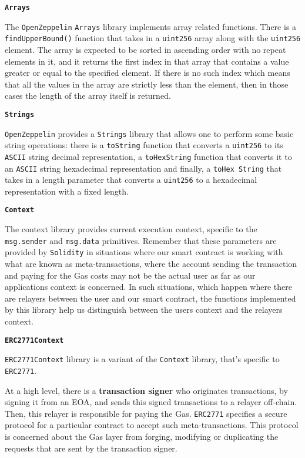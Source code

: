 \textbf{\texttt{Arrays}}

The \texttt{OpenZeppelin} \texttt{Arrays} library implements array
related functions. There is a \texttt{findUpperBound()} function that
takes in a \texttt{uint256} array along with the \texttt{uint256}
element. The array is expected to be sorted in ascending order with no
repeat elements in it, and it returns the first index in that array that
contains a value greater or equal to the specified element. If there is
no such index which means that all the values in the array are strictly
less than the element, then in those cases the length of the array
itself is returned.

\textbf{\texttt{Strings}}

\texttt{OpenZeppelin} provides a \texttt{Strings} library that allows
one to perform some basic string operations: there is a
\texttt{toString} function that converts a \texttt{uint256} to its
\texttt{ASCII} string decimal representation, a \texttt{toHexString}
function that converts it to an \texttt{ASCII} string hexadecimal
representation and finally, a \texttt{toHex\ String} that takes in a
length parameter that converts a \texttt{uint256} to a hexadecimal
representation with a fixed length.

\textbf{\texttt{Context}}

The context library provides current execution context, specific to the
\texttt{msg.sender} and \texttt{msg.data} primitives. Remember that
these parameters are provided by \texttt{Solidity} in situations where
our smart contract is working with what are known as meta-transactions,
where the account sending the transaction and paying for the Gas costs
may not be the actual user as far as our applications context is
concerned. In such situations, which happen where there are relayers
between the user and our smart contract, the functions implemented by
this library help us distinguish between the users context and the
relayers context.

\textbf{\texttt{ERC2771Context}}

\texttt{ERC2771Context} library is a variant of the \texttt{Context}
library, that's specific to \texttt{ERC2771}.

At a high level, there is a \textbf{transaction signer} who originates
transactions, by signing it from an EOA, and sends this signed
transactions to a relayer off-chain. Then, this relayer is responsible
for paying the Gas. \texttt{ERC2771} specifies a secure protocol for a
particular contract to accept such meta-transactions. This protocol is
concerned about the Gas layer from forging, modifying or duplicating the
requests that are sent by the transaction signer.

